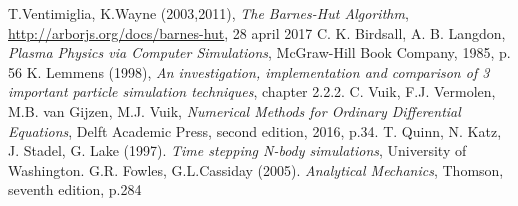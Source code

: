 \begin{thebibliography}{9}
T.Ventimiglia, K.Wayne (2003,2011), \textit{The Barnes-Hut Algorithm}, \url{http://arborjs.org/docs/barnes-hut}, 28 april 2017
C. K. Birdsall, A. B. Langdon, \textit{Plasma Physics via Computer Simulations}, McGraw-Hill Book Company, 1985, p. 56
K. Lemmens (1998), \textit{An investigation, implementation and comparison of 3 important particle simulation techniques}, chapter 2.2.2.
C. Vuik, F.J. Vermolen, M.B. van Gijzen, M.J. Vuik, \textit{Numerical Methods for Ordinary Differential Equations}, Delft Academic Press, second edition, 2016, p.34.
T. Quinn, N. Katz, J. Stadel, G. Lake (1997). \textit{Time stepping N-body simulations}, University of Washington.
G.R. Fowles, G.L.Cassiday (2005). \textit{Analytical Mechanics}, Thomson, seventh edition, p.284
\end{thebibliography}
